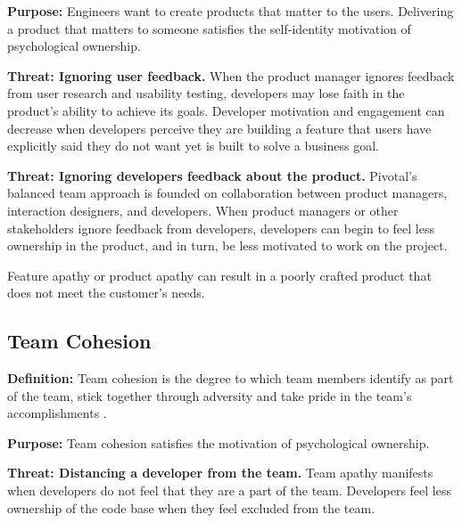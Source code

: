 \textbf{Purpose:} Engineers want to create products that matter to the users. Delivering a product that matters to someone satisfies the self-identity motivation of psychological ownership.


\textbf{Threat: Ignoring user feedback.} When the product manager ignores feedback from user research and usability testing, developers may lose faith in the product's ability to achieve its goals. Developer motivation and engagement can decrease when developers perceive they are building a feature that users have explicitly said they do not want yet is built to solve a business goal. 


\textbf{Threat: Ignoring developers feedback about the product.} Pivotal's balanced team approach is founded on collaboration between product managers, interaction designers, and developers. When product managers or other stakeholders ignore feedback from developers, developers can begin to feel less ownership in the product, and in turn, be less motivated to work on the project. 




Feature apathy or product apathy can result in a poorly crafted product that does not meet the customer's needs.


\subsection{Team Cohesion}
\textbf{Definition:} Team cohesion is the degree to which team members identify as part of the team, stick together through adversity and take pride in the team's accomplishments \cite{Bollen1990Perceived, Beal2003Cohesion, Whitworth2007Motivation}.


\textbf{Purpose:} Team cohesion satisfies the  motivation of psychological ownership.


\textbf{Threat: Distancing a developer from the team.} Team apathy manifests when developers do not feel that they are a part of the team. Developers feel less ownership of the code base when they feel excluded from the team.



